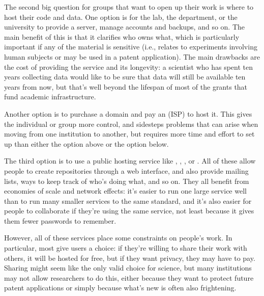 The second big question for groups that want to open up their work is
where to host their code and data. One option is for the lab, the
department, or the university to provide a server, manage accounts and
backups, and so on. The main benefit of this is that it clarifies who
owns what, which is particularly important if any of the material is
sensitive (i.e., relates to experiments involving human subjects or may
be used in a patent application). The main drawbacks are the cost of
providing the service and its longevity: a scientist who has spent ten
years collecting data would like to be sure that data will still be
available ten years from now, but that's well beyond the lifespan of
most of the grants that fund academic infrastructure.

Another option is to purchase a domain and pay an
 (ISP) to host it. This gives
the individual or group more control, and sidesteps problems that can
arise when moving from one institution to another, but requires more
time and effort to set up than either the option above or the option
below.

The third option is to use a public hosting service like
,
,
, or
. All of these allow people to
create repositories through a web interface, and also provide mailing
lists, ways to keep track of who's doing what, and so on. They all
benefit from economies of scale and network effects: it's easier to run
one large service well than to run many smaller services to the same
standard, and it's also easier for people to collaborate if they're
using the same service, not least because it gives them fewer passwords
to remember.

However, all of these services place some constraints on people's work.
In particular, most give users a choice: if they're willing to share
their work with others, it will be hosted for free, but if they want
privacy, they may have to pay. Sharing might seem like the only valid
choice for science, but many institutions may not allow researchers to
do this, either because they want to protect future patent applications
or simply because what's new is often also frightening.

